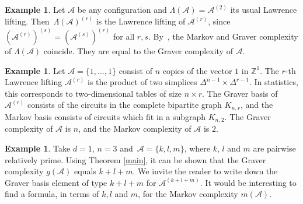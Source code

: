 \documentclass[11pt]{amsart}
\theoremstyle{definition}
\newtheorem{example}[theorem]{Example}
\newcommand{\integers}{{\mathbb Z}}
\newcommand{\A}{{\mathcal A}}
\begin{document}
\begin{example}
  \label{exm:lawrence}
  Let $\A$ be any configuration and $\Lambda(\A)=\A^{(2)}$ its usual
Lawrence  lifting. Then
$\,\Lambda(\A)^{(r)}$ is the Lawrence lifting  of $\A^{(r)}$,
  since $(\A^{(r)})^{(s)}= (\A^{(s)})^{(r)}$ for all $r,s$.
By~\cite[Theorem~7.1]{Sturmfels-book}, the Markov and Graver complexity
of $\Lambda(\A)$ coincide. They are equal to the Graver complexity
of $\A$.
  \end{example}

\begin{example}
\label{exm:productofsimplices}
Let $\A=\{1,\dots,1\}$ consist of $n$ copies of the vector $1$
in $\integers^1$. The $r$-th Lawrence lifting $\A^{(r)}$
is the product of two simplices $\Delta^{n-1}\times \Delta^{r-1}$.
In statistics, this corresponds to two-dimensional tables of size
$n \times r$.
The Graver basis of $\A^{(r)}$ consists of the
circuits in the complete bipartite graph $K_{n,r}$,
and the Markov basis consists of circuits
which fit in a subgraph $K_{n,2}$.
The Graver complexity of $\A$ is $n$,
and  the Markov complexity of $\A$ is $2$.
\end{example}

\begin{example}
\label{exm:pqr}
Take $d=1$, $n=3$ and  $\,\A=\{k,l,m\}$, where $k$, $l$ and $m$ are
pairwise relatively prime. Using Theorem \ref{main}, it can be shown
that the Graver complexity $g(\A)$ equals $k+l+m$. We invite
the reader to write down the Graver basis element of type $k+l+m$ for
$\A^{(k+l+m)}$. It would be interesting to find a formula,
in terms of $k,l$ and $m$, for the Markov complexity $m(\A)$.
\end{example}
\end{document}
